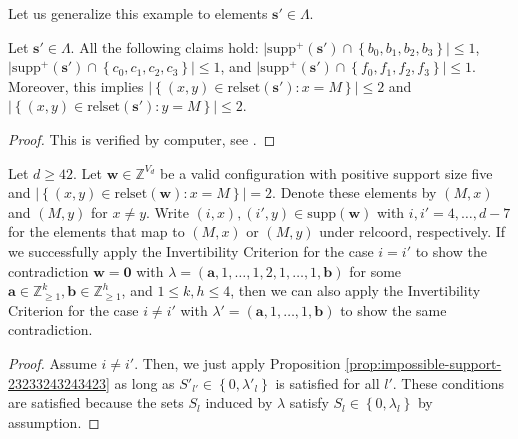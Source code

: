 Let us generalize this example to elements \(  \mathbf{s}' \in \Lambda \).

\begin{proposition}
    Let \( \mathbf{s}' \in \Lambda \). All the following claims hold: \( \lvert \mathrm{supp}^+(\mathbf{s}') \cap \left\{ b_0,b_1,b_2,b_3 \right\} \rvert \leq 1 \), \( \lvert \mathrm{supp}^+(\mathbf{s}') \cap \left\{ c_0,c_1,c_2,c_3 \right\} \rvert \leq 1 \), and \( \lvert \mathrm{supp}^+(\mathbf{s}') \cap \left\{ f_0,f_1,f_2,f_3 \right\} \rvert \leq 1 \). Moreover, this implies \( \lvert \left\{ (x,y) \in \mathrm{relset}(\mathbf{s}') : x = M \right\} \rvert \leq 2 \) and \(  \lvert \left\{ (x,y) \in \mathrm{relset}(\mathbf{s}') : y = M \right\} \rvert \leq 2 \).
\end{proposition}

\begin{proof}
    This is verified by computer, see \cite{ducrepo}.
\end{proof}

\begin{proposition}
    Let \( d\geq 42 \).
    Let \( \mathbf{w} \in \mathbb{Z}^{V_d} \) be a valid configuration with positive support size five and \( \lvert \left\{ (x,y) \in \mathrm{relset}(\mathbf{w}) : x = M \right\} \rvert = 2 \).
    Denote these elements by \( (M, x) \) and \( (M, y) \) for \( x \neq y \). Write \( (i,x), (i',y) \in \mathrm{supp}(\mathbf{w}) \) with \( i,i' = 4, \dots, d-7 \) for the elements that map to \( (M, x) \) or \( (M, y) \) under \( \mathrm{relcoord} \), respectively. If we successfully apply the Invertibility Criterion for the case \( i = i' \) to show the contradiction \( \mathbf{w} = \mathbf 0 \) with \( \lambda = (\mathbf{a},1,\dots,1, 2, 1, \dots, 1, \mathbf{b}) \)
    for some \(\mathbf{a} \in \mathbb{Z}^{k}_{\geq 1}, \mathbf{b} \in \mathbb{Z}^{h}_{\geq 1} \), and \( 1 \leq k,h \leq 4 \), then we can also apply the Invertibility Criterion for the case \( i \neq i' \) with \( \lambda' = (\mathbf{a},1, \dots, 1, \mathbf{b}) \)
    to show the same contradiction.
\end{proposition}

\begin{proof}
    Assume \( i \neq i' \). Then, we just apply Proposition \ref{prop:impossible-support-23233243243423} as long as \( S'_{l'} \in \left\{ 0, \lambda'_l \right\} \) is satisfied for all \( l' \). These conditions are satisfied because the sets \( S_l \) induced by \( \lambda \) satisfy \( S_{l} \in \left\{ 0, \lambda_l \right\} \) by assumption.
\end{proof}


